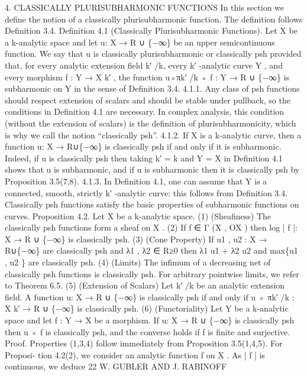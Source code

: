 \documentclass[
  10pt,
]{article}
\newenvironment{Shaded}{}{}
\newcommand{\NormalTok}[1]{#1}
\begin{document}
\begin{Shaded}
\begin{Highlighting}[]
\NormalTok{                     4. CLASSICALLY PLURISUBHARMONIC FUNCTIONS}
\NormalTok{  In this section we define the notion of a classically plurisubharmonic function. The}
\NormalTok{definition follows Definition 3.4.}
\NormalTok{Definition 4.1 (Classically Plurisubharmonic Functions). Let X be a k{-}analytic space and}
\NormalTok{let u: X → R ∪ \{−∞\} be an upper semicontinuous function. We say that u is classically}
\NormalTok{plurisubharmonic or classically psh provided that, for every analytic extension field k′ /k,}
\NormalTok{every k′ {-}analytic curve Y , and every morphism f : Y → X k′ , the function u◦πk′ /k ◦ f : Y →}
\NormalTok{R ∪ \{−∞\} is subharmonic on Y in the sense of Definition 3.4.}
\NormalTok{4.1.1. Any class of psh functions should respect extension of scalars and should be stable}
\NormalTok{under pullback, so the conditions in Definition 4.1 are necessary. In complex analysis,}
\NormalTok{this condition (without the extension of scalars) is the definition of plurisubharmonicity,}
\NormalTok{which is why we call the notion “classically psh”.}
\NormalTok{4.1.2. If X is a k{-}analytic curve, then a function u: X → R∪\{−∞\} is classically psh if and}
\NormalTok{only if it is subharmonic. Indeed, if u is classically psh then taking k′ = k and Y = X in}
\NormalTok{Definition 4.1 shows that u is subharmonic, and if u is subharmonic then it is classically}
\NormalTok{psh by Proposition 3.5(7,8).}
\NormalTok{4.1.3. In Definition 4.1, one can assume that Y is a connected, smooth, strictly k′ {-}analytic}
\NormalTok{curve: this follows from Definition 3.4.}
\NormalTok{  Classically psh functions satisfy the basic properties of subharmonic functions on curves.}
\NormalTok{Proposition 4.2. Let X be a k{-}analytic space.}
\NormalTok{   (1) (Sheafiness) The classically psh functions form a sheaf on X .}
\NormalTok{   (2) If f ∈ Γ (X , OX ) then log | f |: X → R ∪ \{−∞\} is classically psh.}
\NormalTok{   (3) (Cone Property) If u1 , u2 : X → R∪\{−∞\} are classically psh and λ1 , λ2 ∈ R≥0 then}
\NormalTok{       λ1 u1 + λ2 u2 and max\{u1 , u2 \} are classically psh.}
\NormalTok{   (4) (Limits) The infimum of a decreasing net of classically psh functions is classically}
\NormalTok{       psh. For arbitrary pointwise limits, we refer to Theorem 6.5.}
\NormalTok{   (5) (Extension of Scalars) Let k′ /k be an analytic extension field. A function u: X →}
\NormalTok{       R ∪ \{−∞\} is classically psh if and only if u ◦ πk′ /k : X k′ → R ∪ \{−∞\} is classically}
\NormalTok{       psh.}
\NormalTok{   (6) (Functoriality) Let Y be a k{-}analytic space and let f : Y → X be a morphism. If}
\NormalTok{       u: X → R ∪ \{−∞\} is classically psh then u ◦ f is classically psh, and the converse}
\NormalTok{       holds if f is finite and surjective.}
\NormalTok{Proof. Properties (1,3,4) follow immediately from Proposition 3.5(1,4,5). For Proposi{-}}
\NormalTok{tion 4.2(2), we consider an analytic function f on X . As | f | is continuous, we deduce}
\NormalTok{22                                  W. GUBLER AND J. RABINOFF}


\end{Highlighting}
\end{Shaded}
\end{document}
